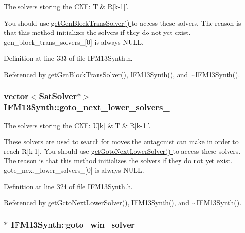 The solvers storing the \hyperlink{classCNF}{C\-N\-F}\-: T \& R\mbox{[}k-\/1\mbox{]}'. 

You should use \hyperlink{classIFM13Synth_af087a4ddf9026bb48a752c03e539d9da}{get\-Gen\-Block\-Trans\-Solver() } to access these solvers. The reason is that this method initializes the solvers if they do not yet exist. gen\-\_\-block\-\_\-trans\-\_\-solvers\-\_\-\mbox{[}0\mbox{]} is always N\-U\-L\-L. 

Definition at line 333 of file I\-F\-M13\-Synth.\-h.



Referenced by get\-Gen\-Block\-Trans\-Solver(), I\-F\-M13\-Synth(), and $\sim$\-I\-F\-M13\-Synth().

\hypertarget{classIFM13Synth_a4b964deefde7cd2cc4d81c8ea6f66976}{
\subsubsection[{goto\-\_\-next\-\_\-lower\-\_\-solvers\-\_\-}]{\setlength{\rightskip}{0pt plus 5cm}vector$<${\bf Sat\-Solver}$\ast$$>$ I\-F\-M13\-Synth\-::goto\-\_\-next\-\_\-lower\-\_\-solvers\-\_\-\hspace{0.3cm}{\ttfamily [protected]}}}\label{classIFM13Synth_a4b964deefde7cd2cc4d81c8ea6f66976}


The solvers storing the \hyperlink{classCNF}{C\-N\-F}\-: U\mbox{[}k\mbox{]} \& T \& R\mbox{[}k-\/1\mbox{]}'. 

These solvers are used to search for moves the antagonist can make in order to reach R\mbox{[}k-\/1\mbox{]}. You should use \hyperlink{classIFM13Synth_ae97c0b41568cf25e163ab9b309f0dcaa}{get\-Goto\-Next\-Lower\-Solver() } to access these solvers. The reason is that this method initializes the solvers if they do not yet exist. goto\-\_\-next\-\_\-lower\-\_\-solvers\-\_\-\mbox{[}0\mbox{]} is always N\-U\-L\-L. 

Definition at line 324 of file I\-F\-M13\-Synth.\-h.



Referenced by get\-Goto\-Next\-Lower\-Solver(), I\-F\-M13\-Synth(), and $\sim$\-I\-F\-M13\-Synth().

\hypertarget{classIFM13Synth_a08f52e41085966317cfc516bd52dc3b3}{
\subsubsection[{goto\-\_\-win\-\_\-solver\-\_\-}]{$\ast$ I\-F\-M13\-Synth\-::goto\-\_\-win\-\_\-solver\-\_\-\hspace{0.3cm}{\ttfamily [protected]}}}\label{classIFM13Synth_a08f52e41085966317cfc516bd52dc3b3}


